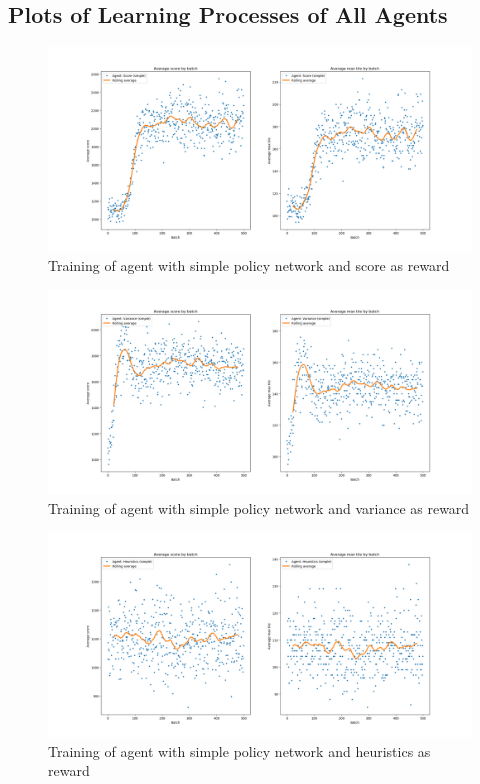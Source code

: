 \documentclass[11pt, fleqn]{article}
\begin{document}
\subsection{Plots of Learning Processes of All Agents}\label{plotlearn}
\begin{figure}[H]
	\centering
	\includegraphics[width=\linewidth]{"train_score_simple"}
	\caption{Training of agent with simple policy network and score as reward}
\end{figure}
\begin{figure}[H]
	\centering
	\includegraphics[width=\linewidth]{"train_variance_simple"}
	\caption{Training of agent with simple policy network and variance as reward}
\end{figure}

\begin{figure}[H]
	\centering
	\includegraphics[width=\linewidth]{"train_heuristics_simple"}
	\caption{Training of agent with simple policy network and heuristics as reward}
\end{figure}
\end{document}
